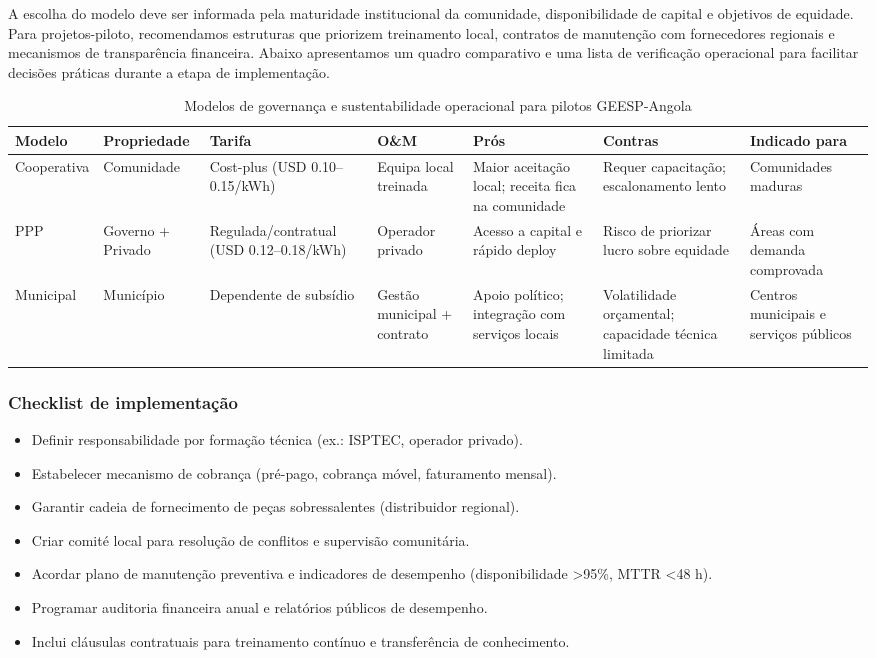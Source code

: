 \documentclass[12pt, a4paper]{article}
\begin{document}
{{{{{{{{{{{{A escolha do modelo deve ser informada pela maturidade institucional da comunidade,
disponibilidade de capital e objetivos de equidade. Para projetos-piloto, recomendamos
estruturas que priorizem treinamento local, contratos de manutenção com fornecedores
regionais e mecanismos de transparência financeira. Abaixo apresentamos um quadro
comparativo e uma lista de verificação operacional para facilitar decisões práticas
durante a etapa de implementação.

\begin{table}[ht]
\centering
\caption{Modelos de governança e sustentabilidade operacional para pilotos GEESP-Angola}
\label{tab:governance_models}
\begin{tabular}{|l|l|l|l|p{3.2cm}|p{3.2cm}|l|}
\hline
\textbf{Modelo} & \textbf{Propriedade} & \textbf{Tarifa} & \textbf{O\&M} & \textbf{Prós} & \textbf{Contras} & \textbf{Indicado para} \\
\hline
Cooperativa & Comunidade & Cost-plus (USD 0.10--0.15/kWh) & Equipa local treinada & Maior aceitação local; receita fica na comunidade & Requer capacitação; escalonamento lento & Comunidades maduras \\
\hline
PPP & Governo + Privado & Regulada/contratual (USD 0.12--0.18/kWh) & Operador privado & Acesso a capital e rápido deploy & Risco de priorizar lucro sobre equidade & Áreas com demanda comprovada \\
\hline
Municipal & Município & Dependente de subsídio & Gestão municipal + contrato & Apoio político; integração com serviços locais & Volatilidade orçamental; capacidade técnica limitada & Centros municipais e serviços públicos \\
\hline
\end{tabular}
\end{table}

\subsubsection*{Checklist de implementação}
\begin{itemize}
  \item Definir responsabilidade por formação técnica (ex.: ISPTEC, operador privado).
  \item Estabelecer mecanismo de cobrança (pré-pago, cobrança móvel, faturamento mensal).
  \item Garantir cadeia de fornecimento de peças sobressalentes (distribuidor regional).
  \item Criar comité local para resolução de conflitos e supervisão comunitária.
  \item Acordar plano de manutenção preventiva e indicadores de desempenho (disponibilidade >95\%, MTTR <48 h).
  \item Programar auditoria financeira anual e relatórios públicos de desempenho.
  \item Inclui cláusulas contratuais para treinamento contínuo e transferência de conhecimento.
\end{itemize}

}}}}}}}}}}}}
\end{document}
